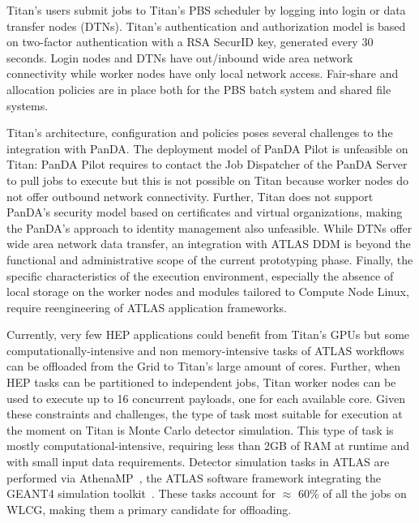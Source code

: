 
Titan's users submit jobs to Titan's PBS scheduler by logging into login or data
transfer nodes (DTNs). Titan's authentication and authorization model is based
on two-factor authentication with a RSA SecurID key, generated every 30 seconds.
Login nodes and DTNs have out/inbound wide area network connectivity while
worker nodes have only local network access. Fair-share and allocation policies
are in place both for the PBS batch system and shared file systems.


Titan's architecture, configuration and policies poses several challenges to the
integration with PanDA. The deployment model of PanDA Pilot is unfeasible on
Titan: PanDA Pilot requires to contact the Job Dispatcher of the PanDA Server to
pull jobs to execute but this is not possible on Titan because worker nodes do
not offer outbound network connectivity. Further, Titan does not support PanDA's
security model based on certificates and virtual organizations, making the
PanDA's approach to identity management also unfeasible. While DTNs offer wide
area network data transfer, an integration with ATLAS DDM is beyond the
functional and administrative scope of the current prototyping phase. Finally,
the specific characteristics of the execution environment, especially the
absence of local storage on the worker nodes and modules tailored to Compute
Node Linux, require reengineering of ATLAS application frameworks.

Currently, very few HEP applications could benefit from Titan's GPUs but some
computationally-intensive and non memory-intensive tasks of ATLAS workflows can
be offloaded from the Grid to Titan's large amount of cores. Further, when HEP
tasks can be partitioned to independent jobs, Titan worker nodes can be used to
execute up to 16 concurrent payloads, one for each available core. Given these
constraints and challenges, the type of task most suitable for execution at the
moment on Titan is Monte Carlo detector simulation. This type of task is mostly
computational-intensive, requiring less than 2GB of RAM at runtime and with
small input data requirements. Detector simulation tasks in ATLAS are performed
via AthenaMP~\cite{aad2010atlas}, the ATLAS software framework integrating the
GEANT4 simulation toolkit~\cite{agostinelli2003geant4}. These tasks account for
$\approx$ 60\% of all the jobs on WLCG, making them a primary candidate for
offloading.


